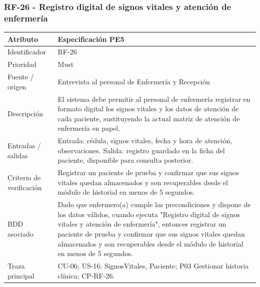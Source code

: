 \documentclass[11pt,a4paper]{article}
\begin{document}
\subsubsection{RF-26 - Registro digital de signos vitales y atención de enfermería}
	\begin{tabularx}{\textwidth}{p{3.2cm}Y}
		\toprule
		\textbf{Atributo} & \textbf{Especificación PE5}\\\midrule
		Identificador & RF-26\\
		Prioridad & Must\\
		Fuente / origen & Entrevista al personal de Enfermería y Recepción\\
		Descripción & El sistema debe permitir al personal de enfermería registrar en formato digital los signos vitales y los datos de atención de cada paciente, sustituyendo la actual matriz de atención de enfermería en papel.\\
		Entradas / salidas & Entrada: cédula, signos vitales, fecha y hora de atención, observaciones. Salida: registro guardado en la ficha del paciente, disponible para consulta posterior.\\
		Criterio de verificación & Registrar un paciente de prueba y confirmar que sus signos vitales quedan almacenados y son recuperables desde el módulo de historial en menos de 5 segundos.\\
		BDD asociado & Dado que enfermero(a) cumple las precondiciones y dispone de los datos válidos, cuando ejecuta "Registro digital de signos vitales y atención de enfermería", entonces registrar un paciente de prueba y confirmar que sus signos vitales quedan almacenados y son recuperables desde el módulo de historial en menos de 5 segundos.\\
		Traza principal & CU-06; US-16; SignosVitales, Paciente; P03 Gestionar historia clínica; CP-RF-26.\\
		\bottomrule
	\end{tabularx}
	\clearpage
\end{document}

